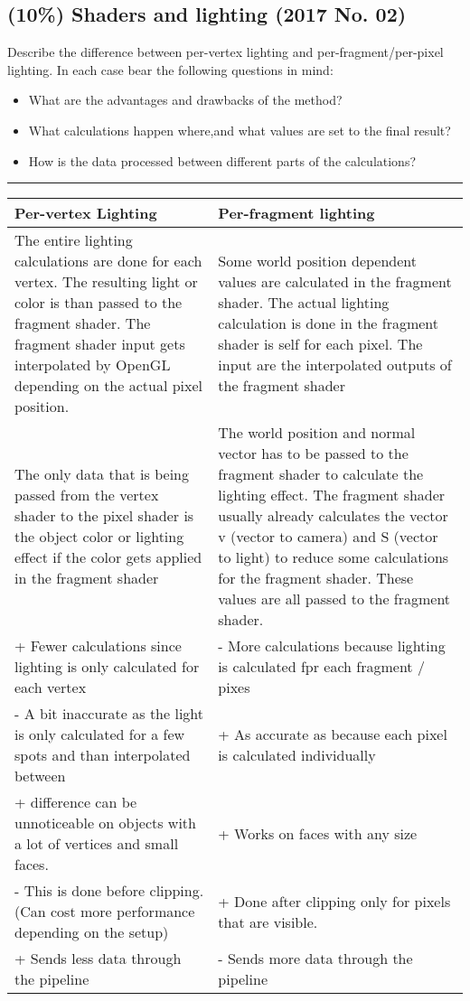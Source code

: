 \subsection{(10\%) Shaders and lighting (2017 No. 02)}
Describe the difference between per-vertex lighting and per-fragment/per-pixel lighting. In each case bear the following questions in mind:

\begin{itemize}
    \item What are the advantages and drawbacks of the method?
    \item What calculations happen where,and what values are set to the final result?
    \item How is the data processed between different parts of the calculations?
\end{itemize}

\rule{\linewidth}{0.1mm}

\begin{tabularx}{\textwidth}{| X | X |}
    \hline
    \textbf{Per-vertex Lighting} & \textbf{Per-fragment lighting} \\ \hline
    The entire lighting calculations are done for each vertex. The resulting light or color is than passed to the fragment shader. The fragment shader input gets interpolated by OpenGL depending on the actual pixel position. & Some world position dependent values are calculated in the fragment shader. The actual lighting calculation is done in the fragment shader is self for each pixel. The input are the interpolated outputs of the fragment shader\\ \hline

    The only data that is being passed from the vertex shader to the pixel shader is the object color or lighting effect if the color gets applied in the fragment shader & The world position and normal vector has to be passed to the fragment shader to calculate the lighting effect. The fragment shader usually already calculates the vector v (vector to camera) and S (vector to light) to reduce some calculations for the fragment shader. These values are all passed to the fragment shader.\\
    \hline

    + Fewer calculations since lighting is only calculated for each vertex & - More calculations because lighting is calculated fpr each fragment / pixes \\
    - A bit inaccurate as the light is only calculated for a few spots and than interpolated between & + As accurate as because each pixel is calculated individually \\
    + difference can be unnoticeable on objects with a lot of vertices and small faces. & + Works on faces with any size \\
    - This is done before clipping. (Can cost more performance depending on the setup) & + Done after clipping only for pixels that are visible. \\
    + Sends less data through the pipeline & - Sends more data through the pipeline \\

    \hline


\end{tabularx}